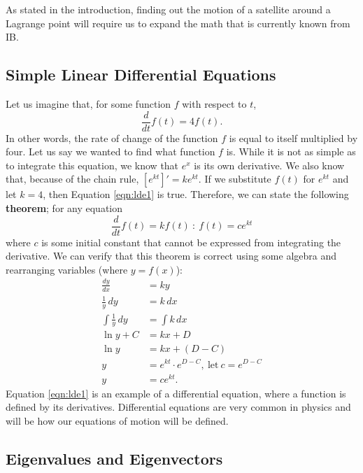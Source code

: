 As stated in the introduction, finding out the motion of a satellite around a Lagrange point will require us to expand the math that is currently known from IB. 

\subsection{Simple Linear Differential Equations} \label{sec:ode}

Let us imagine that, for some function $f$ with respect to $t$,
\begin{equation}\label{eqn:lde1}
	\frac{d}{dt}f(t) = 4f(t)\text{.}
\end{equation}
In other words, the rate of change of the function $f$ is equal to itself multiplied by four. Let us say we wanted to find what function $f$ is.
While it is not as simple as to integrate this equation, we know that $e^x$ is its own derivative.
We also know that, because of the chain rule, $[e^{kt}]' = ke^{kt}$.
If we substitute $f(t)$ for $e^{kt}$ and let $k = 4$, then Equation \eqref{eqn:lde1} is true.
Therefore, we can state the following \textbf{theorem}; for any equation
\begin{equation}\label{eqn:theory1}
	\frac{d}{dt}f(t) = kf(t)\ :\ f(t) = ce^{kt}
\end{equation}
where $c$ is some initial constant that cannot be expressed from integrating the derivative.
We can verify that this theorem is correct using some algebra and rearranging variables (where $y = f(x)$):
\begin{align*}
	\frac{dy}{dx} &= ky \\
	\frac{1}{y}\, dy &= k\, dx \\
	\int \frac{1}{y}\, dy &= \int k\, dx \\
	\ln y + C &= kx + D \\
	\ln y &= kx + (D - C) \\
	y &= e^{kt} \cdot e^{D - C},\ \text{let}\ c = e^{D - C} \\
	y &= ce^{kt} \text{.}
\end{align*}
Equation \eqref{eqn:lde1} is an example of a differential equation, where a function is defined by its derivatives. Differential equations are very common in physics and will be how our equations of motion will be defined.

\subsection{Eigenvalues and Eigenvectors} \label{sec:eigens}

